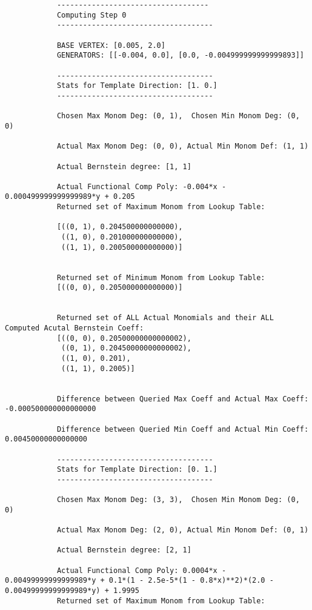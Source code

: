 \begin{verbatim}
            -----------------------------------
            Computing Step 0
            ------------------------------------

            BASE VERTEX: [0.005, 2.0]
            GENERATORS: [[-0.004, 0.0], [0.0, -0.004999999999999893]]

            ------------------------------------
            Stats for Template Direction: [1. 0.]
            ------------------------------------

            Chosen Max Monom Deg: (0, 1),  Chosen Min Monom Deg: (0, 0)

            Actual Max Monom Deg: (0, 0), Actual Min Monom Def: (1, 1)

            Actual Bernstein degree: [1, 1]

            Actual Functional Comp Poly: -0.004*x - 0.000499999999999989*y + 0.205
            Returned set of Maximum Monom from Lookup Table:

            [((0, 1), 0.204500000000000),
             ((1, 0), 0.201000000000000),
             ((1, 1), 0.200500000000000)]


            Returned set of Minimum Monom from Lookup Table:
            [((0, 0), 0.205000000000000)]


            Returned set of ALL Actual Monomials and their ALL Computed Acutal Bernstein Coeff:
            [((0, 0), 0.20500000000000002),
             ((0, 1), 0.20450000000000002),
             ((1, 0), 0.201),
             ((1, 1), 0.2005)]


            Difference between Queried Max Coeff and Actual Max Coeff: -0.000500000000000000

            Difference between Queried Min Coeff and Actual Min Coeff: 0.00450000000000000

            ------------------------------------
            Stats for Template Direction: [0. 1.]
            ------------------------------------

            Chosen Max Monom Deg: (3, 3),  Chosen Min Monom Deg: (0, 0)

            Actual Max Monom Deg: (2, 0), Actual Min Monom Def: (0, 1)

            Actual Bernstein degree: [2, 1]

            Actual Functional Comp Poly: 0.0004*x - 0.00499999999999989*y + 0.1*(1 - 2.5e-5*(1 - 0.8*x)**2)*(2.0 - 0.00499999999999989*y) + 1.9995
            Returned set of Maximum Monom from Lookup Table:


\end{verbatim}
